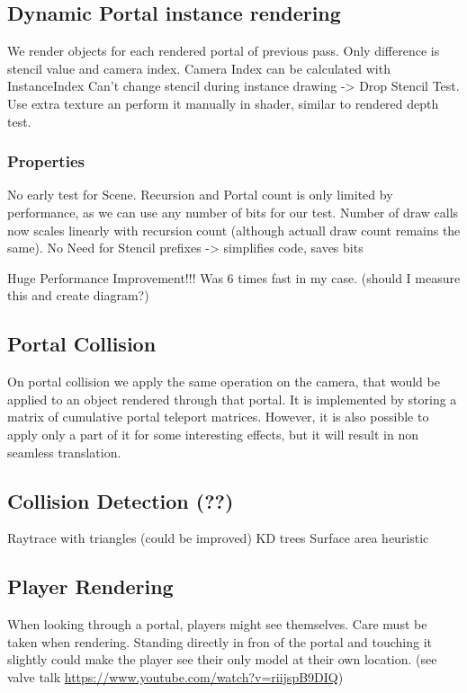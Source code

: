 \subsection{Dynamic Portal instance rendering}
We render objects for each rendered portal of previous pass. Only difference is stencil value and camera index.
Camera Index can be calculated with InstanceIndex
Can't change stencil during instance drawing -> Drop Stencil Test. Use extra texture an perform it manually in shader, similar to rendered depth test. 

\subsubsection{Properties}
No early test for Scene.
Recursion and Portal count is only limited by performance, as we can use any number of bits for our test.
Number of draw calls now scales linearly with recursion count (although actuall draw count remains the same).
No Need for Stencil prefixes -> simplifies code, saves bits

Huge Performance Improvement!!! Was 6 times fast in my case. 
(should I measure this and create diagram?)




\subsection{Portal Collision}
On portal collision we apply the same operation on the camera, that would be applied to an object rendered through that portal.
It is implemented by storing a matrix of cumulative portal teleport matrices.
However, it is also possible to apply only a part of it for some interesting effects, but it will result in non seamless translation.

\subsection{Collision Detection (??)}
Raytrace with triangles (could be improved)
KD trees
Surface area heuristic

\subsection{Player Rendering}
When looking through a portal, players might see themselves. Care must be taken when rendering. Standing directly in fron of the portal and touching it slightly could make the player see their only model at their own location. (see valve talk \url{https://www.youtube.com/watch?v=riijspB9DIQ})



